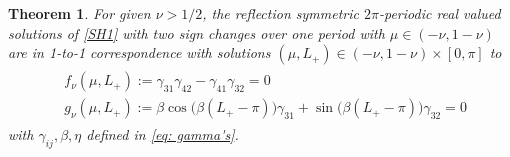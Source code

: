 \documentclass{article}
\numberwithin{equation}{section}
\newtheorem{theorem}{Theorem}[section]
\begin{document}
	\begin{theorem}\label{theorem: reduced system nu>1/2}
For given $\nu > 1/2$, the reflection symmetric $2\pi$-periodic real valued solutions of \eqref{SH1} with two sign changes over one period with $\mu\in (-\nu,1-\nu)$  are in 1-to-1 correspondence with solutions $(\mu,L_+)\in (-\nu,1-\nu)\times [0,\pi]$ to 
		\begin{align}
			\begin{split}\label{reduced system}
				&f_\nu (\mu,L_+) := \gamma_{31} \gamma_{42} - \gamma_{41} \gamma_{32} = 0 \\
				&g_\nu (\mu,L_+) := \beta \cos\big(\beta (L_+ -\pi)\big) \gamma_{31} + \sin\big(\beta (L_+ - \pi)\big) \gamma_{32} = 0
			\end{split}
		\end{align}
		with $\gamma_{ij}, \beta, \eta$ defined in \eqref{eq: gamma's}.
\end{theorem}
\end{document}
